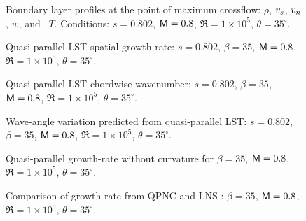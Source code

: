 %
\clearpage
%
%
\begin{figure}[p]
\centering
{}
\epsfxsize=5.4in 
\caption[Boundary layer profiles at the point of maximum crossflow] {Boundary
layer profiles at the point of maximum crossflow: \solid $\rho$, \dashed
${v_s}$, \dotted ${v_n}$, \chndash $w$, and \chndot\  $T$. Conditions: $s=0.802$,
${\sf M}=0.8$, $\Re=1\times 10^5$, $\theta=35^\circ$. \label{f:profile} }
\end{figure}
%
\begin{figure}[p]
\centering
\sethlabel{$\beta$}
\setvlabel{$\sigma$}
\epsfxsize=5.4in 
\caption[Quasi-parallel LST spatial growth-rate] {Quasi-parallel LST spatial
growth-rate: $s=0.802$, $\beta=35$, ${\sf M}=0.8$, $\Re=1\times 10^5$,
$\theta=35^\circ$. \label{f:sigma} }
\end{figure}
%
\begin{figure}[p]
\centering
\sethlabel{$\beta$}
\setvlabel{$\alpha$}
\epsfxsize=5.4in 
\caption[Quasi-parallel LST chordwise wavenumber] {Quasi-parallel LST
chordwise wavenumber: $s=0.802$, $\beta=35$, ${\sf M}=0.8$, $\Re=1\times 10^5$,
$\theta=35^\circ$. \label{f:alpha} }
\end{figure}
%
\begin{figure}[p]
\centering
\sethlabel{$\beta$}
\epsfxsize=5.4in 
\caption[Wave-angle variation predicted from quasi-parallel LST] {Wave-angle
variation predicted from quasi-parallel LST: $s=0.802$, $\beta=35$, ${\sf M}=0.8$,
$\Re=1\times 10^5$, $\theta=35^\circ$. \label{f:psi} }
\end{figure}
%
\begin{figure}[p]
\centering
{}
\setvlabel{$\sigma$}
\epsfxsize=5.4in 
\caption[Quasi-parallel growth-rate without curvature] {Quasi-parallel
growth-rate without curvature for $\beta=35$, ${\sf M}=0.8$, $\Re=1\times 10^5$,
$\theta=35^\circ$. \label{f:QPNCsigma} }
\end{figure}
%
%
\begin{figure}[p]
\centering
{}
\setvlabel{$\sigma$}
\epsfxsize=5.4in 
\caption[Comparison of QPNC and LNS growth-rates] {Comparison of growth-rate
from QPNC \solid and LNS \dashed: $\beta=35$, ${\sf M}=0.8$, $\Re=1\times 10^5$,
$\theta=35^\circ$. \label{f:x5gr} }
\end{figure}
